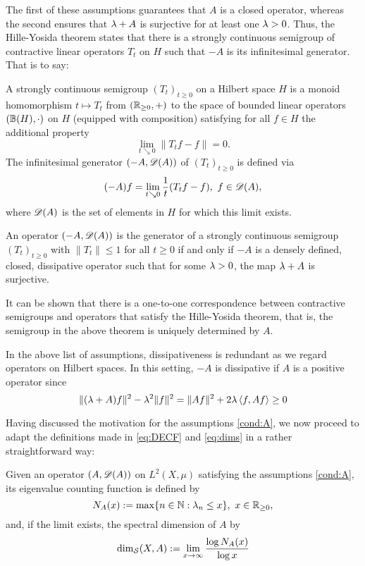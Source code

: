 The first of these assumptions guarantees that $A$ is a closed operator, whereas the second ensures that $\lambda+A$ is surjective for at least one $\lambda>0$. Thus, the Hille-Yosida theorem states that there is a strongly continuous semigroup of contractive linear operators $T_t$ on $H$ such that $-A$ is its infinitesimal generator. That is to say:
\begin{defin}\label{def:semigroup}
  A strongly continuous semigroup $(T_t)_{t\geq0}$ on a Hilbert space $H$ is a monoid homomorphism $t\mapsto T_t$ from $(\mathbb{R}_{\geq0},+)$ to the space of bounded linear operators $(\mathbb{B}(H),\cdot)$ on $H$ (equipped with composition) satisfying for all $f\in H$ the additional property
  \[
    \lim_{t\searrow0} \|T_tf-f\|=0.
  \]
  The infinitesimal generator $(-A,\mathscr{D}(A))$ of $(T_t)_{t\geq0}$ is defined via
  \[
    (-A)f=\lim_{t\searrow0}\frac{1}{t}(T_tf-f),\ f\in\scD(A),
  \]
  where $\mathscr{D}(A)$ is the set of elements in $H$ for which this limit exists.
\end{defin}
\begin{thm}\label{thm:HY}
  An operator $(-A,\mathscr{D}(A))$ is the generator of a strongly continuous semigroup $(T_t)_{t\geq0}$ with $\|T_t\|\leq1$ for all $t\geq0$ if and only if $-A$ is a densely defined, closed, dissipative operator such that for some $\lambda>0$, the map $\lambda+A$ is surjective. 
\end{thm}
It can be shown that there is a one-to-one correspondence between contractive semigroups and operators that satisfy the Hille-Yosida theorem, that is, the semigroup in the above theorem is uniquely determined by $A$. 

\begin{rem}
  In the above list of assumptions, dissipativeness is redundant as we regard operators on Hilbert spaces. In this setting, $-A$ is dissipative if $A$ is a positive operator since
  \[
    \|(\lambda+A)f\|^2-\lambda^2\|f\|^2=\|Af\|^2+2\lambda\left<f,Af\right>\geq0
  \]
\end{rem}


Having discussed the motivation for the assumptions \ref{cond:A}, we now proceed to adapt the definitions made in \eqref{eq:DECF} and \eqref{eq:dims} in a rather straightforward way:
\begin{defin}
  Given an operator $(A,\mathscr{D}(A))$ on $L^2(X,\mu)$ satisfying the assumptions \ref{cond:A}, its eigenvalue counting function is defined by
  \begin{equation}\label{eq:defXVCF}
    N_A(x):=\max\{n\in\mathbb{N}:\lambda_n\leq x\},\ x\in\mathbb{R}_{\geq0},
  \end{equation}
  and, if the limit exists, the spectral dimension of $A$ by
  \begin{equation}\label{eq:defdims}
    \dim_{\mathcal{S}}(X,A):=\lim_{x\to\infty}\frac{\log N_A(x)}{\log x}
  \end{equation}
\end{defin}



